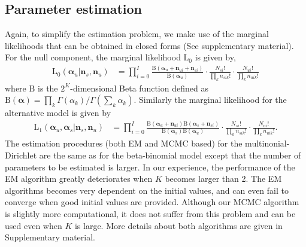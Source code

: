\documentclass[11pt]{article}
\begin{document}
\subsection{Parameter estimation}
Again, to simplify the estimation problem, we make use of the marginal likelihoods that can be obtained in closed forms (See supplementary material). For the null component, the marginal likelihood $\mathrm{L}_0$ is given by,
\begin{align}
\mathrm{L}_0(\boldsymbol{\alpha}_u|\mathbf{n}_s,\mathbf{n}_u) &= \prod_{i=0}^I\frac{ \mathrm{B}(\boldsymbol{\alpha}_{u}+\mathbf{n}_{ui}+\mathbf{n}_{si})}{\mathrm{B}(\boldsymbol{\alpha}_u)} \cdot \frac{N_{si}!}{\prod_k n_{sik}!} \cdot \frac{N_{ui}!}{\prod_k n_{uik}!}
\end{align}
where $\mathrm{B}$ is the $2^K$-dimensional Beta function defined as $\mathrm{B}(\boldsymbol{\alpha})=\prod_k\Gamma(\alpha_k)/\Gamma(\sum_k\alpha_k)$. Similarly the marginal likelihood for the alternative model is given by 
\begin{align}
\mathrm{L}_1(\boldsymbol{\alpha}_u,\boldsymbol{\alpha}_s|\mathbf{n}_s,\mathbf{n}_u) &= \prod_{i=0}^I\frac{\mathrm{B}(\boldsymbol{\alpha}_{u}+\mathbf{n}_{ui}) \mathrm{B}(\boldsymbol{\alpha}_{s}+\mathbf{n}_{si})}{\mathrm{B}(\boldsymbol{\alpha}_s)\mathrm{B}(\boldsymbol{\alpha}_u)} \cdot \frac{N_{si}!}{\prod_k n_{sik}!} \cdot \frac{N_{ui}!}{\prod_k n_{uik}!}.\label{eq:postmult}
\end{align}
The estimation procedures (both EM and MCMC based) for the multinonial-Dirichlet are the same as for the beta-binomial model except that the number of parameters to be estimated is larger. In our experience, the performance of the EM algorithm greatly deteriorates when $K$ becomes larger than 2. The EM algorithms becomes very dependent on the initial values, and can even fail to converge when good initial values are provided. Although our MCMC algorithm is slightly more computational, it does not suffer from this problem and can be used even when $K$ is large. More details about both algorithms are given in Supplementary material. 
\end{document}
